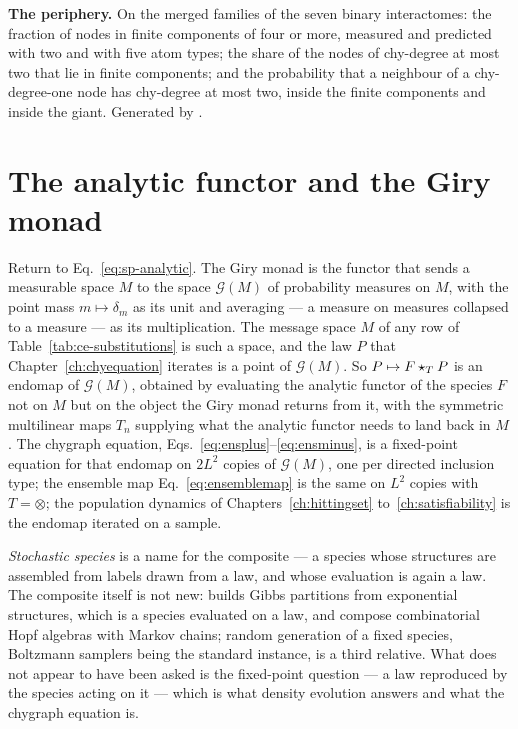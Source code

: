 \begin{table}[tb]
\centering
\begin{adjustbox}{width=\linewidth}

\end{adjustbox}
\caption{\textbf{The periphery.} On the merged families of the seven
binary interactomes: the fraction of nodes in finite components of four
or more, measured and predicted with two and with five atom types; the
share of the nodes of chy-degree at most two that lie in finite
components; and the probability that a neighbour of a chy-degree-one node
has chy-degree at most two, inside the finite components and inside the
giant. Generated by .}
\label{tab:components-periphery}
\end{table}

\section{The analytic functor and the Giry monad}
\label{sec:sp-giry}

Return to Eq.~\eqref{eq:sp-analytic}. The Giry monad \citep{giry1982} is the
functor that
sends a measurable space $M$ to the space $\mathcal{G}(M)$ of probability
measures on $M$, with the point mass $m\mapsto\delta_{m}$ as its unit and
averaging --- a measure on measures collapsed to a measure --- as its
multiplication. The message space $M$ of any row of
Table~\ref{tab:ce-substitutions} is such a space, and the law $P$ that
Chapter~\ref{ch:chyequation} iterates is a point of $\mathcal{G}(M)$. So
$P\mapsto F\star_{T}P$ is an endomap of $\mathcal{G}(M)$, obtained by
evaluating the analytic functor of the species $F$ not on $M$ but on the
object the Giry monad returns from it, with the symmetric multilinear maps
$T_{n}$ supplying what the analytic functor needs to land back in $M$. The
chygraph equation, Eqs.~\eqref{eq:ensplus}--\eqref{eq:ensminus}, is a
fixed-point equation for that endomap on $2L^{2}$ copies of
$\mathcal{G}(M)$, one per directed inclusion type; the ensemble map
Eq.~\eqref{eq:ensemblemap} is the same on $L^{2}$ copies with $T=\otimes$;
the population dynamics of Chapters~\ref{ch:hittingset}
to~\ref{ch:satisfiability} is the endomap iterated on a sample.

\emph{Stochastic species} is a name for the composite --- a species whose
structures are assembled from labels drawn from a law, and whose evaluation
is again a law. The composite itself is not new: \citet{pitman2006} builds
Gibbs partitions from exponential structures, which is a species evaluated
on a law, and \citet{diaconis2014} compose combinatorial Hopf algebras with
Markov chains; random generation of a fixed species, Boltzmann samplers
being the standard instance, is a third relative. What does not appear to
have been asked is the fixed-point question --- a law reproduced by the
species acting on it --- which is what density evolution answers and what
the chygraph equation is.

